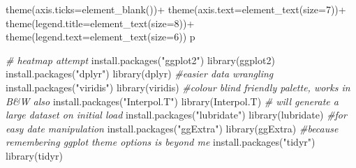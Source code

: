 \documentclass[
]{article}
\newenvironment{Shaded}{\begin{snugshade}}{\end{snugshade}}
\newcommand{\AttributeTok}[1]{\textcolor[rgb]{0.77,0.63,0.00}{#1}}
\newcommand{\CommentTok}[1]{\textcolor[rgb]{0.56,0.35,0.01}{\textit{#1}}}
\newcommand{\DecValTok}[1]{\textcolor[rgb]{0.00,0.00,0.81}{#1}}
\newcommand{\FunctionTok}[1]{\textcolor[rgb]{0.00,0.00,0.00}{#1}}
\newcommand{\NormalTok}[1]{#1}
\newcommand{\SpecialCharTok}[1]{\textcolor[rgb]{0.00,0.00,0.00}{#1}}
\newcommand{\StringTok}[1]{\textcolor[rgb]{0.31,0.60,0.02}{#1}}
\begin{document}
\begin{Shaded}
\begin{Highlighting}[]
  \FunctionTok{theme}\NormalTok{(}\AttributeTok{axis.ticks=}\FunctionTok{element\_blank}\NormalTok{())}\SpecialCharTok{+}
  \FunctionTok{theme}\NormalTok{(}\AttributeTok{axis.text=}\FunctionTok{element\_text}\NormalTok{(}\AttributeTok{size=}\DecValTok{7}\NormalTok{))}\SpecialCharTok{+}
  \FunctionTok{theme}\NormalTok{(}\AttributeTok{legend.title=}\FunctionTok{element\_text}\NormalTok{(}\AttributeTok{size=}\DecValTok{8}\NormalTok{))}\SpecialCharTok{+}
  \FunctionTok{theme}\NormalTok{(}\AttributeTok{legend.text=}\FunctionTok{element\_text}\NormalTok{(}\AttributeTok{size=}\DecValTok{6}\NormalTok{))}
\NormalTok{p}
\end{Highlighting}
\end{Shaded}

\begin{Shaded}
\begin{Highlighting}[]
\CommentTok{\# heatmap attempt }
\FunctionTok{install.packages}\NormalTok{(}\StringTok{"ggplot2"}\NormalTok{)}
\FunctionTok{library}\NormalTok{(ggplot2)}
\FunctionTok{install.packages}\NormalTok{(}\StringTok{"dplyr"}\NormalTok{)}
\FunctionTok{library}\NormalTok{(dplyr) }\CommentTok{\#easier data wrangling }
\FunctionTok{install.packages}\NormalTok{(}\StringTok{"viridis"}\NormalTok{)}
\FunctionTok{library}\NormalTok{(viridis) }\CommentTok{\#colour blind friendly palette, works in B\&W also}
\FunctionTok{install.packages}\NormalTok{(}\StringTok{"Interpol.T"}\NormalTok{)}
\FunctionTok{library}\NormalTok{(Interpol.T) }\CommentTok{\# will generate a large dataset on initial load}
\FunctionTok{install.packages}\NormalTok{(}\StringTok{"lubridate"}\NormalTok{)}
\FunctionTok{library}\NormalTok{(lubridate) }\CommentTok{\#for easy date manipulation}
\FunctionTok{install.packages}\NormalTok{(}\StringTok{"ggExtra"}\NormalTok{)}
\FunctionTok{library}\NormalTok{(ggExtra) }\CommentTok{\#because remembering ggplot theme options is beyond me}
\FunctionTok{install.packages}\NormalTok{(}\StringTok{"tidyr"}\NormalTok{)}
\FunctionTok{library}\NormalTok{(tidyr) }


\end{Highlighting}
\end{Shaded}
\end{document}
